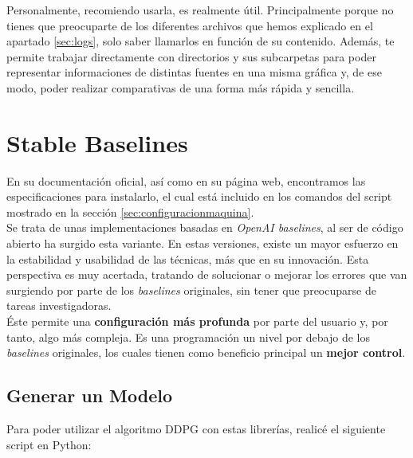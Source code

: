 \documentclass[11pt,fleqn]{book} %
\begin{document}
Personalmente, recomiendo usarla, es realmente útil. Principalmente porque no tienes que preocuparte de los diferentes archivos que hemos explicado en el apartado \ref{sec:logs}, solo saber llamarlos en función de su contenido. Además, te permite trabajar directamente con directorios y sus subcarpetas para poder representar informaciones de distintas fuentes en una misma gráfica y, de ese modo, poder realizar comparativas de una forma más rápida y sencilla.

\chapter{Stable Baselines}\label{sec:stablebaselines}

En su documentación oficial\cite{book:stablebaselines}, así como en su página web\cite{article:stablebaselines}, encontramos las especificaciones para instalarlo, el cual está incluido en los comandos del script mostrado en la sección \ref{sec:configuracionmaquina}. \\

Se trata de unas implementaciones basadas en \textit{OpenAI baselines}, al ser de código abierto ha surgido esta variante. En estas versiones, existe un mayor esfuerzo en la estabilidad y usabilidad de las técnicas, más que en su innovación. Esta perspectiva es muy acertada, tratando de solucionar o mejorar los errores que van surgiendo por parte de los \textit{baselines} originales, sin tener que preocuparse de tareas investigadoras. \\

Éste permite una \textbf{configuración más profunda} por parte del usuario y, por tanto, algo más compleja. Es una programación un nivel por debajo de los \textit{baselines} originales, los cuales tienen como beneficio principal un \textbf{mejor control}. \\

\section{Generar un Modelo}

Para poder utilizar el algoritmo DDPG con estas librerías, realicé el siguiente script en Python:\\
\end{document}
